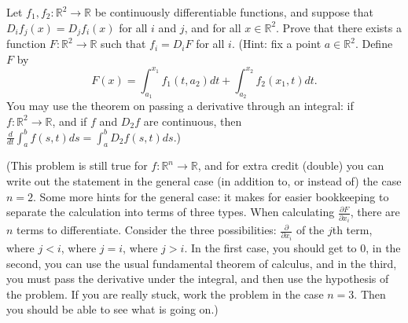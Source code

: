 \documentclass[12pt]{article}
\newenvironment{problem}[2][Problem]{\begin{trivlist}
\item[\hskip \labelsep {\bfseries #1}\hskip \labelsep {\bfseries
#2.}]}{\end{trivlist}}
\begin{document}
  
  
  
  \begin{problem}{11}
  Let $f_1, f_2 : \mathbb{R}^2 \to \mathbb{R}$ be continuously differentiable functions, and suppose that $D_if_j(x) = D_jf_i(x)$ for all $i$ and $j$, and for all $x \in \mathbb{R}^2$. Prove that there exists a function $F : \mathbb{R}^2 \to \mathbb{R}$ such that $f_i = D_iF$ for all $i$. (Hint: fix a point $a \in \mathbb{R}^2$. Define $F$ by $$F(x) = \int_{a_1}^{x_1}f_1(t,a_2)dt + \int_{a_2}^{x_2}f_2(x_1,t)dt.$$ You may use the theorem on passing a derivative through an integral: if $f : \mathbb{R}^2 \to \mathbb{R}$, and if $f$ and $D_2f$ are continuous, then $\frac{d}{dt} \int_a^b f(s,t)ds = \int_a^bD_2f(s,t)ds$.)
  
  (This problem is still true for $f : \mathbb{R}^n \to \mathbb{R}$, and for extra credit (double) you can write out the statement in the general case (in addition to, or instead of) the case $n = 2$. Some more hints for the general case: it makes for easier bookkeeping to separate the calculation into terms of three types. When calculating $\frac{\partial F}{\partial x_i}$, there are $n$ terms to differentiate. Consider the three possibilities: $\frac{\partial}{\partial x_i}$ of the $j$th term, where $j < i$, where $j = i$, where $j > i$. In the first case, you should get to 0, in the second, you can use the usual fundamental theorem of calculus, and in the third, you must pass the derivative under the integral, and then use the hypothesis of the problem. If you are really stuck, work the problem in the case $n = 3$. Then you should be able to see what is going on.)
  \end{problem}
\end{document}

